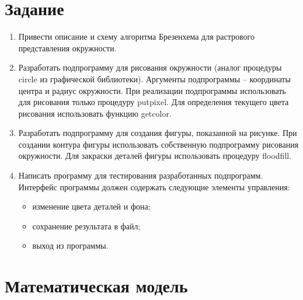 \documentclass[14pt, a4paper]{extreport}
\begin{document}
\author{Савонин~М.В.}
\maketitle

\chapter{Задание}

\begin{enumerate}

	\item
	Привести описание и схему алгоритма Брезенхема для растрового представления окружности.

	\item
	Разработать подпрограмму для рисования окружности (аналог процедуры circle из графической библиотеки). Аргументы подпрограммы – координаты 	центра и радиус окружности. При реализации подпрограммы использовать для рисования только процедуру putpixel. Для определения текущего 			цвета рисования использовать функцию getcolor.

	\item
	Разработать подпрограмму для создания фигуры, показанной на рисунке. При создании контура фигуры использовать собственную подпрограмму 			рисования окружности. Для закраски деталей фигуры использовать процедуру floodfill.

	\item
	Написать программу для тестирования разработанных подпрограмм. Интерфейс программы должен содержать следующие элементы управления:
	\begin{itemize}
		\item изменение цвета деталей и фона;
		\item сохранение результата в файл;
		\item выход из программы.
	\end{itemize}

\end{enumerate}

\chapter{Математическая модель}
\end{document}
